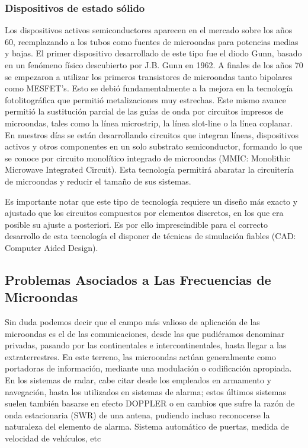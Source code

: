 \documentclass[12pt]{article}
\begin{document}
\subsubsection{Dispositivos de estado s\'olido}Los dispositivos activos semiconductores aparecen en el mercado sobre los a\~nos 60, reemplazando a los tubos como fuentes de microondas para potencias medias y bajas. El primer dispositivo desarrollado de este tipo fue el diodo Gunn, basado en un fen\'omeno f\'isico descubierto por J.B. Gunn en 1962. A finales de los a\~nos 70 se empezaron a utilizar los primeros transistores de microondas tanto bipolares como MESFET’s. Esto se debi\'o fundamentalmente a la mejora en la tecnolog\'ia fotolitogr\'afica que permiti\'o metalizaciones muy estrechas. Este mismo avance permiti\'o la sustituci\'on parcial de las gu\'ias de onda por circuitos impresos de microondas, tales como la l\'inea microstrip, la l\'inea slot-line o la l\'inea coplanar. En nuestros d\'ias se est\'an desarrollando circuitos que integran l\'ineas, dispositivos activos y otros componentes en un solo substrato semiconductor, formando lo que se conoce por circuito monol\'itico integrado de microondas (MMIC: Monolithic Microwave Integrated Circuit). Esta tecnolog\'ia permitir\'a abaratar la circuiter\'ia de microondas y reducir el tama\~no de sus sistemas.
\vspace{0.4cm}
	
Es importante notar que este tipo de tecnolog\'ia requiere un dise\~no m\'as exacto y ajustado que los circuitos compuestos por elementos discretos, en los que era posible su ajuste a posteriori. Es por ello imprescindible para el correcto desarrollo de esta tecnolog\'ia el disponer de t\'ecnicas de simulaci\'on fiables (CAD: Computer Aided Design).

\subsection{Problemas Asociados a Las Frecuencias de Microondas}
Sin duda podemos decir que el campo m\'as valioso de aplicaci\'on de las microondas es el de las comunicaciones, desde las que pudi\'eramos denominar privadas, pasando por las continentales e intercontinentales, hasta llegar a las extraterrestres. En este terreno, las microondas act\'uan generalmente como portadoras de informaci\'on, mediante una modulaci\'on o codificaci\'on apropiada. En los sistemas de radar, cabe citar desde los empleados en armamento y navegaci\'on, hasta los utilizados en sistemas de alarma; estos \'ultimos sistemas suelen tambi\'en basarse en efecto DOPPLER o en cambios que sufre la raz\'on de onda estacionaria (SWR) de una antena, pudiendo incluso reconocerse la naturaleza del elemento de alarma. Sistema autom\'atico de puertas, medida de velocidad de veh\'iculos, etc
\vspace{0.4cm}
	
\end{document}
